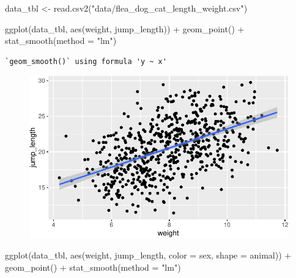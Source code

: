 \documentclass[
  letterpaper,
]{scrbook}
\newenvironment{Shaded}{\begin{snugshade}}{\end{snugshade}}
\newcommand{\AttributeTok}[1]{\textcolor[rgb]{0.40,0.45,0.13}{#1}}
\newcommand{\FunctionTok}[1]{\textcolor[rgb]{0.28,0.35,0.67}{#1}}
\newcommand{\NormalTok}[1]{\textcolor[rgb]{0.00,0.23,0.31}{#1}}
\newcommand{\OtherTok}[1]{\textcolor[rgb]{0.00,0.23,0.31}{#1}}
\newcommand{\SpecialCharTok}[1]{\textcolor[rgb]{0.37,0.37,0.37}{#1}}
\newcommand{\StringTok}[1]{\textcolor[rgb]{0.13,0.47,0.30}{#1}}
\begin{document}
\begin{Shaded}
\begin{Highlighting}[]
\NormalTok{data\_tbl }\OtherTok{\textless{}{-}} \FunctionTok{read.csv2}\NormalTok{(}\StringTok{"data/flea\_dog\_cat\_length\_weight.csv"}\NormalTok{)}
\end{Highlighting}
\end{Shaded}

\begin{Shaded}
\begin{Highlighting}[]
\FunctionTok{ggplot}\NormalTok{(data\_tbl, }\FunctionTok{aes}\NormalTok{(weight, jump\_length)) }\SpecialCharTok{+}
  \FunctionTok{geom\_point}\NormalTok{() }\SpecialCharTok{+}
  \FunctionTok{stat\_smooth}\NormalTok{(}\AttributeTok{method =} \StringTok{"lm"}\NormalTok{)}
\end{Highlighting}
\end{Shaded}

\begin{verbatim}
`geom_smooth()` using formula 'y ~ x'
\end{verbatim}

\begin{figure}[H]

{\centering \includegraphics{./stat-modeling-gaussian_files/figure-pdf/unnamed-chunk-5-1.pdf}

}

\end{figure}

\begin{Shaded}
\begin{Highlighting}[]
\FunctionTok{ggplot}\NormalTok{(data\_tbl, }\FunctionTok{aes}\NormalTok{(weight, jump\_length, }\AttributeTok{color =}\NormalTok{ sex, }\AttributeTok{shape =}\NormalTok{ animal)) }\SpecialCharTok{+}
  \FunctionTok{geom\_point}\NormalTok{() }\SpecialCharTok{+}
  \FunctionTok{stat\_smooth}\NormalTok{(}\AttributeTok{method =} \StringTok{"lm"}\NormalTok{)}
\end{Highlighting}
\end{Shaded}
\end{document}
